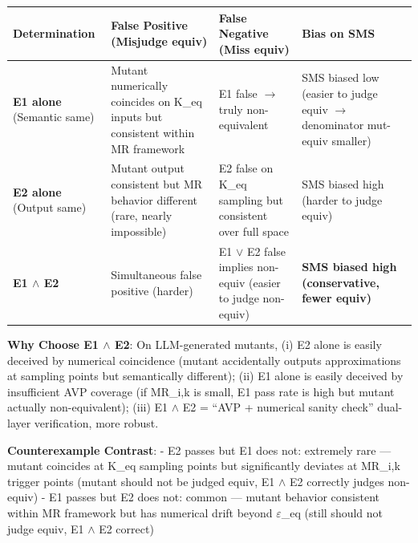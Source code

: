 \documentclass[review,12pt,authoryear]{elsarticle}
\begin{document}
{\def\LTcaptype{none} %
\begin{longtable}[]{@{}
  >{\raggedright\arraybackslash}p{}
  >{\raggedright\arraybackslash}p{}
  >{\raggedright\arraybackslash}p{}
  >{\raggedright\arraybackslash}p{}@{}}
\toprule\noalign{}
\begin{minipage}[b]{\linewidth}\raggedright
Determination
\end{minipage} & \begin{minipage}[b]{\linewidth}\raggedright
False Positive (Misjudge equiv)
\end{minipage} & \begin{minipage}[b]{\linewidth}\raggedright
False Negative (Miss equiv)
\end{minipage} & \begin{minipage}[b]{\linewidth}\raggedright
Bias on SMS
\end{minipage} \\
\midrule\noalign{}
\endhead
\bottomrule\noalign{}
\endlastfoot
\textbf{E1 alone} (Semantic same) & Mutant numerically coincides on
K\_eq inputs but consistent within MR framework & E1 false $\to$ truly
non-equivalent & SMS biased low (easier to judge equiv $\to$ denominator
mut-equiv smaller) \\
\textbf{E2 alone} (Output same) & Mutant output consistent but MR
behavior different (rare, nearly impossible) & E2 false on K\_eq
sampling but consistent over full space & SMS biased high (harder to
judge equiv) \\
\textbf{E1 $\wedge$ E2} & Simultaneous false positive (harder) & E1 $\vee$ E2 false
implies non-equiv (easier to judge non-equiv) & \textbf{SMS biased high
(conservative, fewer equiv)} \\
\end{longtable}
}

\textbf{Why Choose E1 $\wedge$ E2}: On LLM-generated mutants, (i) E2 alone is
easily deceived by numerical coincidence (mutant accidentally outputs
approximations at sampling points but semantically different); (ii) E1
alone is easily deceived by insufficient AVP coverage (if
\textbar MR\_i,k\textbar{} is small, E1 pass rate is high but mutant
actually non-equivalent); (iii) E1 $\wedge$ E2 = ``AVP + numerical sanity
check'' dual-layer verification, more robust.

\textbf{Counterexample Contrast}: - E2 passes but E1 does not: extremely
rare --- mutant coincides at K\_eq sampling points but significantly
deviates at MR\_i,k trigger points (mutant should not be judged equiv,
E1 $\wedge$ E2 correctly judges non-equiv) - E1 passes but E2 does not: common
--- mutant behavior consistent within MR framework but has numerical
drift beyond $\varepsilon$\_eq (still should not judge equiv, E1 $\wedge$ E2 correct)
\end{document}
